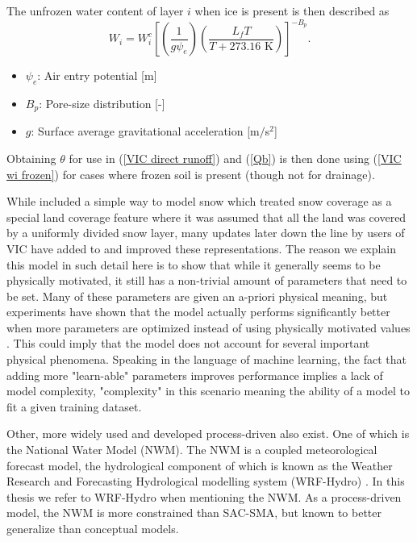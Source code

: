 The unfrozen  water content of layer $i$ when ice is present is then described as 
\begin{equation}
    W_i = W_i^c \left[ \left( \frac{1}{g \psi_e} \right) \left( \frac{L_fT}{T+273.16
    \text{ K}}  \right) \right]^{-B_p}. \label{VIC wi frozen}
\end{equation}

\begin{itemize}
    \item $\psi_e$: Air entry potential [m]
    \item $B_p$: Pore-size distribution [-]
    \item $g$: Surface average gravitational acceleration [m$/$s$^2$]
\end{itemize}
Obtaining $\theta$ for use in (\ref{VIC direct runoff}) and (\ref{Qb}) is then done 
using (\ref{VIC wi frozen}) for cases where frozen soil is present (though not for 
drainage). 

While \citet{VIC} included a simple way to model snow which treated snow coverage as 
a special land coverage feature where it was assumed that all the land was covered 
by a uniformly divided snow layer, many updates later down the line by users of VIC 
have added to and improved these representations. 
The reason we explain this model in such detail here is to show that while it 
generally seems to be physically motivated, it still has a non-trivial amount of 
parameters that need to be set. Many of these parameters are given an a-priori 
physical meaning, but experiments have shown that the model actually performs 
significantly better when more parameters are optimized instead of using physically 
motivated values \citep{VICbench, BiasVarianceVIC}. This could imply that the model does not account 
for several important physical phenomena.
Speaking in the language of machine learning, the fact that adding more "learn-able" 
parameters improves performance implies a lack of model complexity, "complexity" in 
this scenario meaning the ability of a model to fit a given training dataset.

Other, more widely used and developed process-driven also exist. One of which is 
the National Water Model (NWM). The NWM is a coupled meteorological forecast model, 
the hydrological component of which is known as the Weather Research and Forecasting 
Hydrological modelling system (WRF-Hydro) \citep{WRF-hydro-original, WFR-hydro-manual}. 
In this thesis we refer to WRF-Hydro when mentioning the NWM.
As a process-driven model, the NWM is more constrained 
than SAC-SMA, but known to better generalize than conceptual models.

